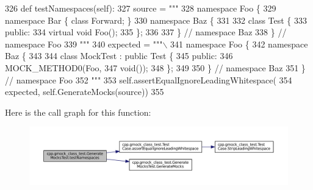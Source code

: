 \begin{DoxyCode}
326   \textcolor{keyword}{def }testNamespaces(self):
327     source = \textcolor{stringliteral}{"""}
328 \textcolor{stringliteral}{namespace Foo \{}
329 \textcolor{stringliteral}{namespace Bar \{ class Forward; \}}
330 \textcolor{stringliteral}{namespace Baz \{}
331 \textcolor{stringliteral}{}
332 \textcolor{stringliteral}{class Test \{}
333 \textcolor{stringliteral}{ public:}
334 \textcolor{stringliteral}{  virtual void Foo();}
335 \textcolor{stringliteral}{\};}
336 \textcolor{stringliteral}{}
337 \textcolor{stringliteral}{\}  // namespace Baz}
338 \textcolor{stringliteral}{\}  // namespace Foo}
339 \textcolor{stringliteral}{"""}
340     expected = \textcolor{stringliteral}{"""\(\backslash\)}
341 \textcolor{stringliteral}{namespace Foo \{}
342 \textcolor{stringliteral}{namespace Baz \{}
343 \textcolor{stringliteral}{}
344 \textcolor{stringliteral}{class MockTest : public Test \{}
345 \textcolor{stringliteral}{public:}
346 \textcolor{stringliteral}{MOCK\_METHOD0(Foo,}
347 \textcolor{stringliteral}{void());}
348 \textcolor{stringliteral}{\};}
349 \textcolor{stringliteral}{}
350 \textcolor{stringliteral}{\}  // namespace Baz}
351 \textcolor{stringliteral}{\}  // namespace Foo}
352 \textcolor{stringliteral}{"""}
353     self.assertEqualIgnoreLeadingWhitespace(
354         expected, self.GenerateMocks(source))
355 
\end{DoxyCode}
Here is the call graph for this function\+:
\nopagebreak
\begin{figure}[H]
\begin{center}
\leavevmode
\includegraphics[width=350pt]{classcpp_1_1gmock__class__test_1_1GenerateMocksTest_a706812da9e8f79a689c707b4032db2d2_cgraph}
\end{center}
\end{figure}
\mbox{\label{classcpp_1_1gmock__class__test_1_1GenerateMocksTest_a4098c99b66f0cbea7be9e66352a20f4d}} 
